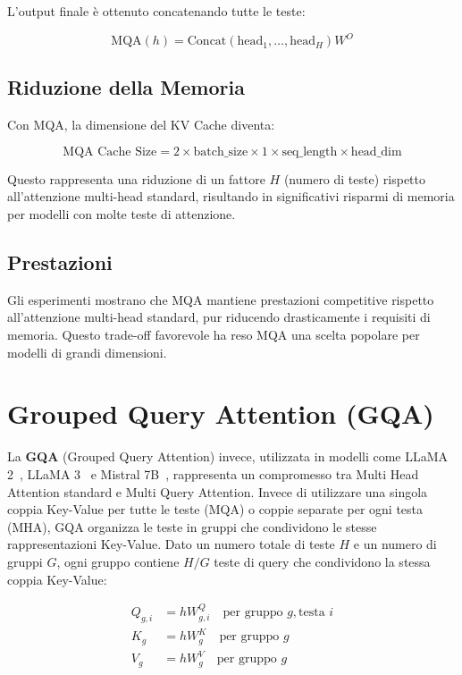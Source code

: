 L'output finale è ottenuto concatenando tutte le teste:

\begin{equation}
    \text{MQA}(h) = \text{Concat}(\text{head}_1, \ldots, \text{head}_H) W^O
\end{equation}

\subsection{Riduzione della Memoria}
Con MQA, la dimensione del KV Cache diventa:

\begin{equation}
    \text{MQA Cache Size} = 2 \times \text{batch\_size} \times 1 \times \text{seq\_length} \times \text{head\_dim}
\end{equation}

Questo rappresenta una riduzione di un fattore $H$ (numero di teste) rispetto all'attenzione multi-head standard, risultando in significativi risparmi di memoria per modelli con molte teste di attenzione.

\subsection{Prestazioni}
Gli esperimenti mostrano che MQA mantiene prestazioni competitive rispetto all'attenzione multi-head standard, pur riducendo drasticamente i requisiti di memoria. Questo trade-off favorevole ha reso MQA una scelta popolare per modelli di grandi dimensioni.

\section{Grouped Query Attention (GQA)}

La \textbf{GQA} (Grouped Query Attention) invece, utilizzata in modelli come LLaMA 2~\cite{touvron2023llama}, LLaMA 3~\cite{touvron2024llama3} e Mistral 7B~\cite{mistral2023mistral7b}, rappresenta un compromesso tra Multi Head Attention standard e Multi Query Attention. Invece di utilizzare una singola coppia Key-Value per tutte le teste (MQA) o coppie separate per ogni testa (MHA), GQA organizza le teste in gruppi che condividono le stesse rappresentazioni Key-Value. Dato un numero totale di teste $H$ e un numero di gruppi $G$, ogni gruppo contiene $H/G$ teste di query che condividono la stessa coppia Key-Value:

\begin{align*}
    Q_{g,i} &= h W_{g,i}^Q \quad \text{per gruppo } g, \text{testa } i \\
    K_g &= h W_g^K \quad \text{per gruppo } g \\
    V_g &= h W_g^V \quad \text{per gruppo } g
\end{align*}

